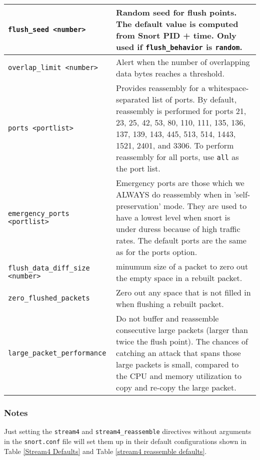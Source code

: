 \documentclass[english]{report}
\begin{document}
\begin{tabular}{| p{} | p{} |}
\hline
\texttt{flush\_seed <number>} & Random seed for flush points.  The default value is computed from Snort PID + time.  Only used if \texttt{flush\_behavior} is \texttt{random}. \\
\hline
\texttt{overlap\_limit <number>} & Alert when the number of overlapping data bytes reaches a threshold.\\
\hline
\texttt{ports <portlist>} & Provides reassembly for a
whitespace-separated list of ports.  By default, reassembly is performed
for ports 21, 23, 25, 42, 53, 80, 110, 111, 135, 136, 137, 139, 143, 445,
513, 514, 1443, 1521, 2401, and 3306. To perform reassembly for all ports, use
\texttt{all} as the port list.\\
\hline
\texttt{emergency\_ports <portlist>} & Emergency ports are those which we ALWAYS do reassembly when in 'self-preservation' mode. They are used to have a lowest level when snort is under duress because of high traffic rates. The default ports are the same as for the ports option.\\
\hline
\texttt{flush\_data\_diff\_size <number>} & minumum size of a packet to zero out the empty space in a rebuilt packet. \\
\hline
\texttt{zero\_flushed\_packets} & Zero out any space that is not filled in when flushing a rebuilt packet.\\
\hline
\texttt{large\_packet\_performance} & Do not buffer and reassemble consecutive large packets (larger than twice the flush point). The chances of catching an attack that spans those large packets is small, compared to the CPU and memory utilization to copy and re-copy the large packet.\\
\hline
\end{tabular}

\subsubsection{Notes}

Just setting the \texttt{stream4} and \texttt{stream4\_reassemble} directives without
arguments in the \texttt{snort.conf} file will set them up in their default
configurations shown in Table \ref{Stream4 Defaults} and Table \ref{stream4 reassemble defaults}.

\vspace{-30pt}
\end{document}
